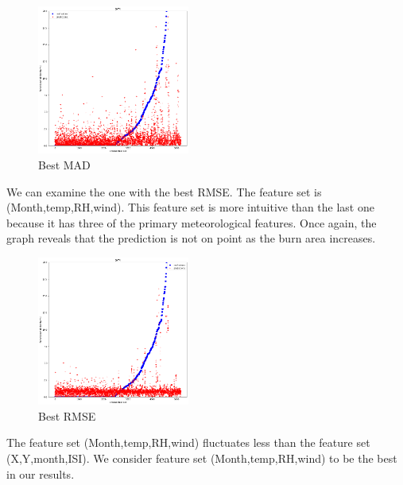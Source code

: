 \documentclass[conference]{IEEEtran}
\begin{document}
\begin{center}
    \begin{figure}[H]
        \centering
        \includegraphics[width=5cm]{MAD_Best.png}
        \caption{Best MAD}
        \label{fig:best_mad_graph}
    \end{figure}
\end{center}

We can examine the one with the best RMSE. The feature set is (Month,temp,RH,wind). This feature set is more intuitive than the last one because it has three of the primary meteorological features. Once again, the graph reveals that the prediction is not on point as the burn area increases. 

\begin{center}
    \begin{figure}[H]
        \centering
        \includegraphics[width=5cm]{RMSE_Best.png}
        \caption{Best RMSE}
        \label{fig:best_RMSE_graph}
    \end{figure}
\end{center}

The feature set (Month,temp,RH,wind) fluctuates less than the feature set (X,Y,month,ISI). We consider feature set (Month,temp,RH,wind) to be the best in our results.

\end{document}
